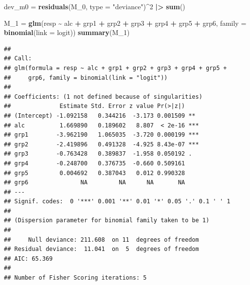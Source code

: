 \documentclass[
]{article}
\newenvironment{Shaded}{\begin{snugshade}}{\end{snugshade}}
\newcommand{\AttributeTok}[1]{\textcolor[rgb]{0.13,0.29,0.53}{#1}}
\newcommand{\DecValTok}[1]{\textcolor[rgb]{0.00,0.00,0.81}{#1}}
\newcommand{\FunctionTok}[1]{\textcolor[rgb]{0.13,0.29,0.53}{\textbf{#1}}}
\newcommand{\NormalTok}[1]{#1}
\newcommand{\OtherTok}[1]{\textcolor[rgb]{0.56,0.35,0.01}{#1}}
\newcommand{\SpecialCharTok}[1]{\textcolor[rgb]{0.81,0.36,0.00}{\textbf{#1}}}
\newcommand{\StringTok}[1]{\textcolor[rgb]{0.31,0.60,0.02}{#1}}
\begin{document}
\begin{Shaded}
\begin{Highlighting}[]
\NormalTok{dev\_m0 }\OtherTok{=} \FunctionTok{residuals}\NormalTok{(M\_0, }\AttributeTok{type =} \StringTok{"deviance"}\NormalTok{)}\SpecialCharTok{\^{}}\DecValTok{2} \SpecialCharTok{|\textgreater{}} \FunctionTok{sum}\NormalTok{()}

\NormalTok{M\_1 }\OtherTok{=} \FunctionTok{glm}\NormalTok{(resp }\SpecialCharTok{\textasciitilde{}}\NormalTok{ alc }\SpecialCharTok{+}\NormalTok{ grp1 }\SpecialCharTok{+}\NormalTok{ grp2 }\SpecialCharTok{+}\NormalTok{ grp3 }\SpecialCharTok{+}\NormalTok{ grp4 }\SpecialCharTok{+}\NormalTok{ grp5 }\SpecialCharTok{+}\NormalTok{ grp6, }\AttributeTok{family =} \FunctionTok{binomial}\NormalTok{(}\AttributeTok{link =} \StringTok{\textquotesingle{}logit\textquotesingle{}}\NormalTok{))}
\FunctionTok{summary}\NormalTok{(M\_1)}
\end{Highlighting}
\end{Shaded}

\begin{verbatim}
## 
## Call:
## glm(formula = resp ~ alc + grp1 + grp2 + grp3 + grp4 + grp5 + 
##     grp6, family = binomial(link = "logit"))
## 
## Coefficients: (1 not defined because of singularities)
##              Estimate Std. Error z value Pr(>|z|)    
## (Intercept) -1.092158   0.344216  -3.173 0.001509 ** 
## alc          1.669890   0.189602   8.807  < 2e-16 ***
## grp1        -3.962190   1.065035  -3.720 0.000199 ***
## grp2        -2.419896   0.491328  -4.925 8.43e-07 ***
## grp3        -0.763428   0.389837  -1.958 0.050192 .  
## grp4        -0.248700   0.376735  -0.660 0.509161    
## grp5         0.004692   0.387043   0.012 0.990328    
## grp6               NA         NA      NA       NA    
## ---
## Signif. codes:  0 '***' 0.001 '**' 0.01 '*' 0.05 '.' 0.1 ' ' 1
## 
## (Dispersion parameter for binomial family taken to be 1)
## 
##     Null deviance: 211.608  on 11  degrees of freedom
## Residual deviance:  11.041  on  5  degrees of freedom
## AIC: 65.369
## 
## Number of Fisher Scoring iterations: 5
\end{verbatim}
\end{document}
